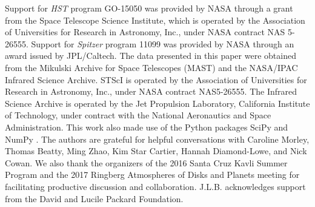 \documentclass[twocolumn]{aastex61}
\begin{document}



\acknowledgments
Support for \textit{HST} program GO-15050 was provided by NASA through a grant from the Space Telescope Science Institute, which is operated by the Association of Universities for Research in Astronomy, Inc., under NASA contract NAS 5-26555. Support for \textit{Spitzer} program 11099 was provided by NASA through an award issued by JPL/Caltech.  The data presented in this paper were obtained from the Mikulski Archive for Space Telescopes (MAST) and the NASA/IPAC Infrared Science Archive. STScI is operated by the Association of Universities for Research in Astronomy, Inc., under NASA contract NAS5-26555. The Infrared Science Archive is operated by the Jet Propulsion Laboratory, California Institute of Technology, under contract with the National Aeronautics and Space Administration.  This work also made use of the Python packages  SciPy and NumPy \citep{jones_scipy_2001, van2011numpy}. The authors are grateful for helpful conversations with Caroline Morley, Thomas Beatty, Ming Zhao, Kim Star Cartier, Hannah Diamond-Lowe, and Nick Cowan. We also thank the organizers of the 2016 Santa Cruz Kavli Summer Program and the 2017 Ringberg Atmospheres of Disks and Planets meeting for facilitating productive discussion and collaboration.
J.L.B. acknowledges support from the David and Lucile Packard Foundation.  



\end{document}

